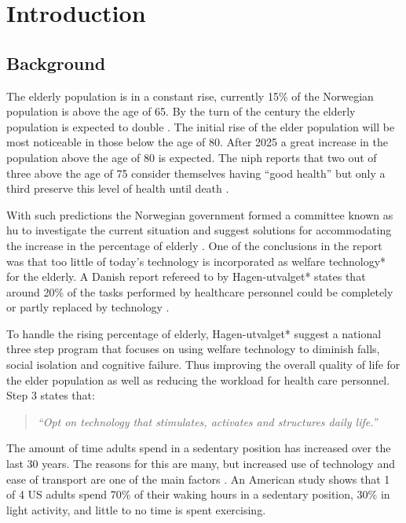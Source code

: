 \chapter{Introduction}

\section{Background}
The elderly population is in a constant rise, currently 15\% of the Norwegian population is above the age of 65. By the turn of the century the elderly population is expected to double \cite{elder}. The initial rise of the elder population will be most noticeable in those below the age of 80. After 2025 a great increase in the population above the age of 80 is expected. The \gls{niph} reports that two out of three above the age of 75 consider themselves having ``good health'' but only a third preserve this level of health until death \cite{elder}.

With such predictions the Norwegian government formed a committee known as \gls{hu} to investigate the current situation and suggest solutions for accommodating the increase in the percentage of elderly \cite{haagen}. One of the conclusions in the report was that too little of today's technology is incorporated as welfare technology* for the elderly. A Danish report refereed to by Hagen-utvalget* states that around 20\% of the tasks performed by healthcare personnel could be completely or partly replaced by technology \cite{kmd}.

To handle the rising percentage of elderly, Hagen-utvalget* suggest a national three step program that focuses on using welfare technology to diminish falls, social isolation and cognitive failure. Thus improving the overall quality of life for the elder population as well as reducing the workload for health care personnel. Step 3 states that:
\begin{quote}
\textit{``Opt on technology that stimulates, activates and structures daily life.''}
\end{quote}

The amount of time adults spend in a sedentary position has increased over the last 30 years. The reasons for this are many, but increased use of technology and ease of transport are one of the main factors \cite{sedentaryBehaviour}. An American study shows that 1 of 4 US adults spend 70\% of their waking hours in a sedentary position, 30\% in light activity, and little to no time is spent exercising.

